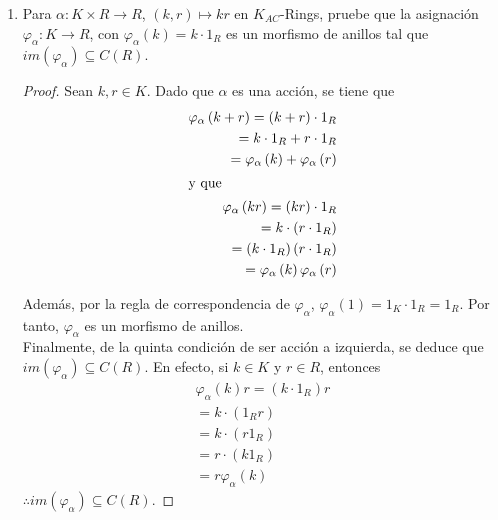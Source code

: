 \documentclass{article}
\newcommand{\lrprth}[1]{
    \left(#1\right)
}
\newcommand{\ringcenter}[1]{
    C\lrprth{#1}
}
\theoremstyle{definition}
\theoremstyle{plain}
\theoremstyle{plain}
\theoremstyle{definition}
\theoremstyle{definition}
\theoremstyle{definition}
\theoremstyle{definition}
\theoremstyle{definition}
\theoremstyle{definition}
\begin{document}
\begin{enumerate}[label=\textbf{Ej \arabic*.}]
\begin{proof}
\begin{align*}
        &=\lrprth{k\bullet\varphi r_1}r_2.\\
        &=r_1\lrprth{\varphi(k)r_2}\\
        &=r_1\lrprth{k\bullet_\varphi r_2}.
    \end{align*}
    $\boxed{\text{(AC5)}}$ Sean $r\in R$. Así
    \begin{align*}
        1_K\bullet_\varphi r&=\varphi(1_K)r\\
        &=1_R\cdot r && ,\ \varphi\text{ es un morfismo de anillos.}\\
        \therefore & \ \lrprth{R,\bullet_\varphi}\in K_{Ac}-Rings.
    \end{align*}
    \end{proof}
    
    \item Para $\alpha : K \times R \longrightarrow R$, $\lrprth{k,r} \mapsto kr$ en $K_{AC}$-Rings, pruebe que la asignación $\varphi_{\alpha} : K \longrightarrow R$, con $\varphi_{\alpha}\lrprth{k}=k \cdot 1_{R}$ es un morfismo de anillos tal que $im\lrprth{\varphi_{\alpha}}\subseteq \ringcenter{R}$.
	\begin{proof}
		Sean $k,r \in K$. Dado que $\alpha$ es una acción, se tiene que
		\begin{align*}
			\varphi_{\alpha}\lrprth{k+r}=\lrprth{k+r}\cdot 1_{R}\\
			=k \cdot 1_{R} + r \cdot 1_{R}\\
			=\varphi_{\alpha}\lrprth{k}+\varphi_{\alpha}\lrprth{r}\\
			\intertext{y que}
			\varphi_{\alpha}\lrprth{kr}=\lrprth{kr}\cdot 1_{R}\\
			=k \cdot\lrprth{r \cdot 1_{R}}\\
			=\lrprth{k \cdot 1_{R}}\lrprth{r \cdot 1_{R}}\\
			=\varphi_{\alpha}\lrprth{k}\varphi_{\alpha}\lrprth{r}
		\end{align*}

		Además, por la regla de correspondencia de $\varphi_{\alpha}$, $\varphi_{\alpha}\lrprth{1}=1_{K} \cdot 1_{R} = 1_{R}$. Por tanto, $\varphi_{\alpha}$ es un morfismo de anillos.\\

		Finalmente, de la quinta condición de ser acción a izquierda, se deduce que $im\lrprth{\varphi_{\alpha}}\subseteq\ringcenter{R}$. En efecto, si $k \in K$ y $r \in R$, entonces
		\begin{align*}
			\varphi_{\alpha}\lrprth{k}r=\lrprth{k \cdot 1_{R}}r\\
			=k \cdot\lrprth{1_{R}r}\\
			=k \cdot\lrprth{r1_{R}}\\
			=r \cdot\lrprth{k1_{R}}\\
			=r\varphi_{\alpha}\lrprth{k}
		\end{align*}
		$\therefore im\lrprth{\varphi_{\alpha}}\subseteq \ringcenter{R}$.
	\end{proof}
	

\end{enumerate}
\end{document}

